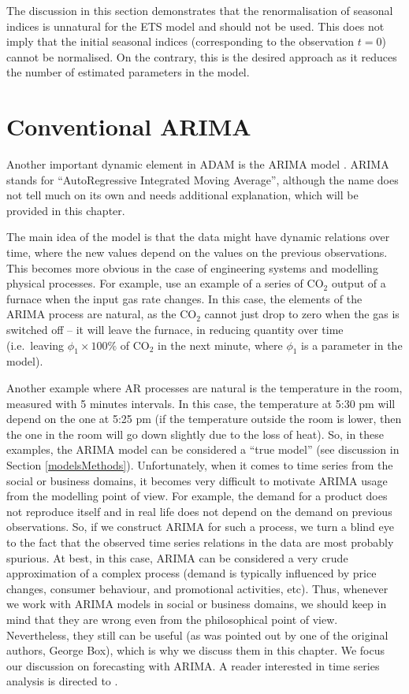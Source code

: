 \documentclass[]{book}
\theoremstyle{definition}
\theoremstyle{definition}
\theoremstyle{definition}
\theoremstyle{definition}
\theoremstyle{remark}
\begin{document}
The discussion in this section demonstrates that the renormalisation of seasonal indices is unnatural for the ETS model and should not be used. This does not imply that the initial seasonal indices (corresponding to the observation \(t=0\)) cannot be normalised. On the contrary, this is the desired approach as it reduces the number of estimated parameters in the model.

\hypertarget{ARIMA}{%
\chapter{Conventional ARIMA}\label{ARIMA}}

Another important dynamic element in ADAM is the ARIMA model \citep[developed originally by][]{Box1976}. ARIMA stands for ``AutoRegressive Integrated Moving Average'', although the name does not tell much on its own and needs additional explanation, which will be provided in this chapter.

The main idea of the model is that the data might have dynamic relations over time, where the new values depend on the values on the previous observations. This becomes more obvious in the case of engineering systems and modelling physical processes. For example, \citet{Box1976} use an example of a series of CO\(_2\) output of a furnace when the input gas rate changes. In this case, the elements of the ARIMA process are natural, as the CO\(_2\) cannot just drop to zero when the gas is switched off -- it will leave the furnace, in reducing quantity over time (i.e.~leaving \(\phi_1\times100\%\) of CO\(_2\) in the next minute, where \(\phi_1\) is a parameter in the model).

Another example where AR processes are natural is the temperature in the room, measured with 5 minutes intervals. In this case, the temperature at 5:30 pm will depend on the one at 5:25 pm (if the temperature outside the room is lower, then the one in the room will go down slightly due to the loss of heat). So, in these examples, the ARIMA model can be considered a ``true model'' (see discussion in Section \ref{modelsMethods}). Unfortunately, when it comes to time series from the social or business domains, it becomes very difficult to motivate ARIMA usage from the modelling point of view. For example, the demand for a product does not reproduce itself and in real life does not depend on the demand on previous observations. So, if we construct ARIMA for such a process, we turn a blind eye to the fact that the observed time series relations in the data are most probably spurious. At best, in this case, ARIMA can be considered a very crude approximation of a complex process (demand is typically influenced by price changes, consumer behaviour, and promotional activities, etc). Thus, whenever we work with ARIMA models in social or business domains, we should keep in mind that they are wrong even from the philosophical point of view. Nevertheless, they still can be useful (as was pointed out by one of the original authors, George Box), which is why we discuss them in this chapter. We focus our discussion on forecasting with ARIMA. A reader interested in time series analysis is directed to \citet{Box1976}.
\end{document}
